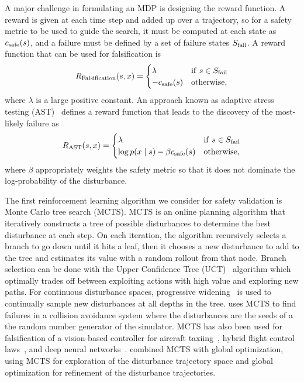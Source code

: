 A major challenge in formulating an MDP is designing the reward function. A reward is given at each time step and added up over a trajectory, so for a safety metric to be used to guide the search, it must be computed at each state as $c_{\rm safe}(s)$, and a failure must be defined by a set of failure states $S_{\rm fail}$. A reward function that can be used for falsification is 
\begin{equation}
    R_{\rm Falsification}(s, x) = \begin{cases}
        \lambda  & {\rm if} \ s \in S_{\rm fail} \\
        -c_{\rm safe}(s) & {\rm otherwise} \text{,}
    \end{cases}
\end{equation}
where $\lambda$ is a large positive constant. An approach known as adaptive stress testing (AST)~\cite{lee2015adaptive,koren2019adaptive} defines a reward function that leads to the discovery of the most-likely failure as
\begin{equation}
    R_{\rm AST}(s, x) = \begin{cases}
        \lambda  & {\rm if} \ s \in S_{\rm fail} \\
        \log p(x \mid s) - \beta c_{\rm safe}(s) & {\rm otherwise} \text{,}
    \end{cases}
\end{equation}
where $\beta$ appropriately weights the safety metric so that it does not dominate the log-probability of the disturbance.

The first reinforcement learning algorithm we consider for safety validation is Monte Carlo tree search (MCTS). MCTS is an online planning algorithm that iteratively constructs a tree of possible disturbances to determine the best disturbance at each step. On each iteration, the algorithm recursively selects a branch to go down until it hits a leaf, then it chooses a new disturbance to add to the tree and estimates its value with a random rollout from that node. Branch selection can be done with the Upper Confidence Tree (UCT)~\cite{kocsis2006bandit} algorithm which optimally trades off between exploiting actions with high value and exploring new paths. For continuous disturbance spaces, progressive widening~\cite{coulom2007computing,chaslot2008progressive} is used to continually sample new disturbances at all depths in the tree. \textcite{lee2015adaptive} uses MCTS to find failures in a collision avoidance system where the disturbances are the seeds of a the random number generator of the simulator. MCTS has also been used for falsification of a vision-based controller for aircraft taxiing~\cite{julian2020validation}, hybrid flight control laws~\cite{delmas2019evaluation}, and deep neural networks~\cite{wicker2018feature}. \textcite{zhang2018two} combined MCTS with global optimization, using MCTS for exploration of the disturbance trajectory space and global optimization for refinement of the disturbance trajectories.

